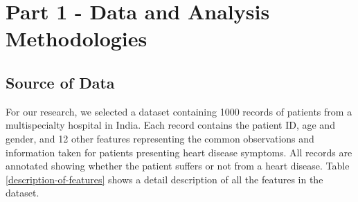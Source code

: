 \section{Part 1 - Data and Analysis Methodologies}

\subsection{Source of Data}

For our research, we selected a dataset containing 1000 records of patients from a multispecialty hospital in India.
Each record contains the patient ID, age and gender, and 12 other features representing the common observations and
information taken for patients presenting heart disease symptoms. All records are annotated showing whether the patient
suffers or not from a heart disease. Table \ref{description-of-features} shows a detail description of all the features
in the dataset.

